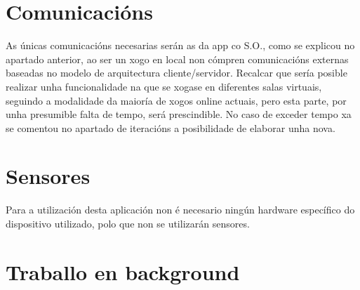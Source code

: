 \section {Comunicacións}
As únicas comunicacións necesarias serán as da app co S.O., como se explicou no apartado anterior, ao ser un xogo en local non cómpren comunicacións externas baseadas no modelo de arquitectura cliente/servidor. Recalcar que sería posible realizar unha funcionalidade na que se xogase en diferentes salas virtuais, seguindo a modalidade da maioría de xogos online actuais, pero esta parte, por unha presumible falta de tempo, será prescindible. No caso de exceder tempo xa se comentou no apartado de iteracións a posibilidade de elaborar unha nova.

\section {Sensores}
Para a utilización desta aplicación non é necesario ningún hardware específico do dispositivo utilizado, polo que non se utilizarán sensores. 

\section {Traballo en background} 

\let\cleardoublepage=\clearpage